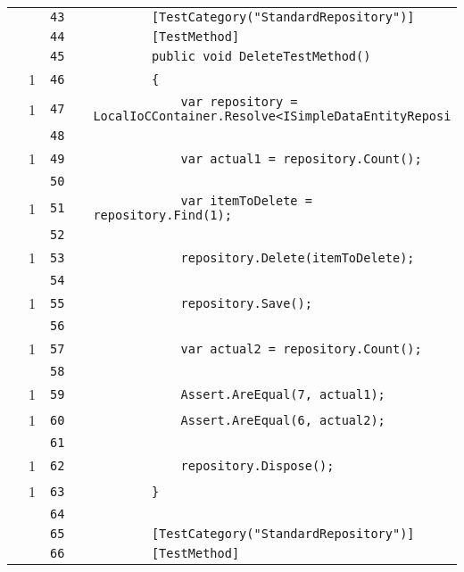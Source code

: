 \documentclass[a4paper,10pt]{article}
\begin{document}
\begin{longtable}[l]{lrrll}
\cellcolor{gray} &  & \verb~43~ & & \verb~        [TestCategory("StandardRepository")]~\\
\cellcolor{gray} &  & \verb~44~ & & \verb~        [TestMethod]~\\
\cellcolor{gray} &  & \verb~45~ & & \verb~        public void DeleteTestMethod()~\\
\cellcolor{green} & 1 & \verb~46~ & & \verb~        {~\\
\cellcolor{green} & 1 & \verb~47~ & & \verb~            var repository = LocalIoCContainer.Resolve<ISimpleDataEntityReposi~\\
\cellcolor{gray} &  & \verb~48~ & & \verb~~\\
\cellcolor{green} & 1 & \verb~49~ & & \verb~            var actual1 = repository.Count();~\\
\cellcolor{gray} &  & \verb~50~ & & \verb~~\\
\cellcolor{green} & 1 & \verb~51~ & & \verb~            var itemToDelete = repository.Find(1);~\\
\cellcolor{gray} &  & \verb~52~ & & \verb~~\\
\cellcolor{green} & 1 & \verb~53~ & & \verb~            repository.Delete(itemToDelete);~\\
\cellcolor{gray} &  & \verb~54~ & & \verb~~\\
\cellcolor{green} & 1 & \verb~55~ & & \verb~            repository.Save();~\\
\cellcolor{gray} &  & \verb~56~ & & \verb~~\\
\cellcolor{green} & 1 & \verb~57~ & & \verb~            var actual2 = repository.Count();~\\
\cellcolor{gray} &  & \verb~58~ & & \verb~~\\
\cellcolor{green} & 1 & \verb~59~ & & \verb~            Assert.AreEqual(7, actual1);~\\
\cellcolor{green} & 1 & \verb~60~ & & \verb~            Assert.AreEqual(6, actual2);~\\
\cellcolor{gray} &  & \verb~61~ & & \verb~~\\
\cellcolor{green} & 1 & \verb~62~ & & \verb~            repository.Dispose();~\\
\cellcolor{green} & 1 & \verb~63~ & & \verb~        }~\\
\cellcolor{gray} &  & \verb~64~ & & \verb~~\\
\cellcolor{gray} &  & \verb~65~ & & \verb~        [TestCategory("StandardRepository")]~\\
\cellcolor{gray} &  & \verb~66~ & & \verb~        [TestMethod]~\\

\end{longtable}
\end{document}
